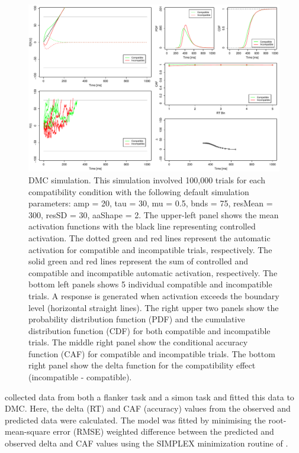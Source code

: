 \begin{figure}
    \includegraphics[width=1\textwidth]{../figures/figure1.pdf}
    \caption{
        DMC simulation. This simulation involved 100,000 trials for each
        compatibility condition with the following default simulation
        parameters: amp = 20, tau = 30, mu = 0.5, bnds = 75, resMean = 300,
        resSD = 30, aaShape = 2. The upper-left panel shows the mean activation
        functions with the black line representing controlled activation. The
        dotted green and red lines represent the automatic activation for
        compatible and incompatible trials, respectively. The solid green and
        red lines represent the sum of controlled and compatible and
        incompatible automatic activation, respectively. The bottom left panels
        shows 5 individual compatible and incompatible trials. A response is
        generated when activation exceeds the boundary level (horizontal
        straight lines). The right upper two panels show the probability
        distribution function (PDF) and the cumulative distribution function
        (CDF) for both compatible and incompatible trials. The middle right
        panel show the conditional accuracy function (CAF) for compatible and
        incompatible trials. The bottom right panel show the delta function for
        the compatibility effect (incompatible - compatible).
    }
    \label{fig:1}
\end{figure}
\textcite{ulrich2015automatic} collected data from both a flanker task and a
simon task and fitted this data to DMC. Here, the delta (RT) and CAF (accuracy)
values from the observed and predicted data were calculated. The model was
fitted by minimising the root-mean-square error (RMSE) weighted difference
between the predicted and observed delta and CAF values using the SIMPLEX
minimization routine of \textcite{nelder1965simplex}.

